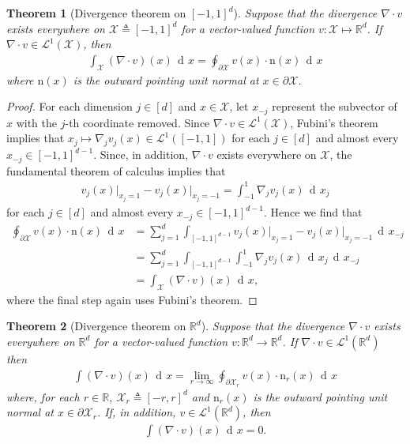 \documentclass[12pt,paper=letter]{scrreprt}
\newtheorem{theorem}{Theorem}[chapter]
\newcommand{\dee}{\mathop{\mathrm{d}\!}}
\newcommand{\dx}{\,\dee x}
\def\reals{\mathbb{R}} %
\def\R{\mathbb{R}}
\newcommand{\Rd}{{\R}^d}
\def\defeq{\triangleq} %
\newcommand{\grad}{\nabla} %
\newcommand{\Div}[1]{\grad\cdot{#1}} %
\newcommand{\normal}{\mathrm{n}} %
\newcommand{\evalat}[2]{{#1}\big|_{#2}}
\newcommand{\xset}[0]{\mathcal{X}} %
\newcommand{\Lp}[1][p]{\mathcal{L}^{#1}}
\begin{document}
\begin{theorem}[{Divergence theorem on $[-1,1]^d$}]\label{thm:divergence standard}
Suppose that the divergence $\Div{v}$ exists everywhere on $\xset \defeq [-1,1]^d$ for a vector-valued function $v : \xset \mapsto \reals^d$. 
If $\Div{v}\in\Lp[1](\xset)$, then
\begin{align*}
\int_{\xset} (\Div{v})(x) \dx 
    = 
\oint_{\partial \xset} v(x) \cdot \normal(x) \dx
\end{align*}
where $\normal(x)$ is the outward pointing unit normal at $x \in \partial \xset$.
\end{theorem}
\begin{proof}
For each dimension $j\in[d]$ and $x\in \xset$, let $x_{-j}$ represent the subvector of $x$ with the $j$-th coordinate removed. 
Since $\Div{v}\in\Lp[1](\xset)$, Fubini's theorem \citep[Thm.~8.8]{rudin1987real} implies that $x_{j}\mapsto\grad_j v_j(x) \in\Lp[1]([-1,1])$ for each $j\in[d]$ and almost every $x_{-j}\in [-1,1]^{d-1}$.
Since, in addition, $\Div{v}$ exists everywhere on $\xset$, the fundamental theorem of calculus \citep[Thm.~7.21]{rudin1987real} implies that
\begin{align*}
\evalat{v_j(x)}{x_j=1} - \evalat{v_j(x)}{x_j=-1} 
    = 
\int_{-1}^1 \grad_j v_j(x) \dx_j
\end{align*}
for each $j\in [d]$ and almost every $x_{-j}\in [-1,1]^{d-1}$.
Hence we find that
\begin{align*}
\oint_{\partial \xset} v(x) \cdot \normal(x) \dx
    &= 
\sum_{j=1}^d \int_{[-1,1]^{d-1}} \evalat{v_j(x)}{x_j=1} - \evalat{v_j(x)}{x_j=-1} \dx_{-j} \\
    &=
\sum_{j=1}^d \int_{[-1,1]^{d-1}} \int_{-1}^1 \grad_j v_j(x) \dx_j \dx_{-j} \\
    &=
\int_{\xset} (\Div{v})(x) \dx,
\end{align*}
where the final step again uses Fubini's theorem.
\end{proof}
\begin{theorem}[Divergence theorem on $\Rd$]\label{thm: divergence}
Suppose that the divergence $\Div{v}$ exists everywhere on $\Rd$ for a vector-valued function $v : \Rd \rightarrow \reals^d$. 
If $\Div{v}\in\Lp[1](\Rd)$ then
\begin{align*}
\int (\Div{v})(x) \dx 
    = 
\lim_{r\to\infty}\oint_{\partial \xset_r} v(x) \cdot \normal_r(x) \dx
\end{align*}
where, for each $r\in\reals$,  $\xset_r\defeq [-r,r]^d$ and $\normal_r(x)$ is the outward pointing unit normal at $x \in \partial \xset_r$.
If, in addition, $v\in\Lp[1](\Rd)$, then
\begin{align*}
\int (\Div{v})(x) \dx 
    = 
0.
\end{align*}
\end{theorem}
\end{document}
